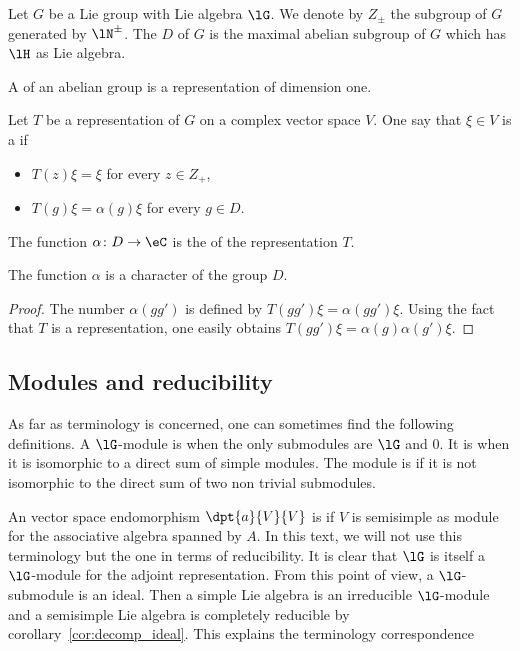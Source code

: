 Let $G$ be a Lie group with Lie algebra $\lG$. We denote by $Z_{\pm}$ the subgroup of $G$ generated by $\lN^{\pm}$. The  $D$ of $G$ is the maximal abelian subgroup of $G$ which has $\lH$ as Lie algebra.

A  of an abelian group is a representation of dimension one.

 Let $T$ be a representation of $G$ on a complex vector space $V$. One say that $\xi\in V$ is a  if
\begin{itemize}
\item $T(z)\xi=\xi$ for every $z\in Z_+$,
\item $T(g)\xi=\alpha(g)\xi$ for every $g\in D$.
\end{itemize}
The function $\alpha\colon D\to \eC$ is the  of the representation $T$.

\begin{lemma}
    The function $\alpha$ is a character of the group $D$.
\end{lemma}

\begin{proof}
    The number $\alpha(gg')$ is defined by $T(gg')\xi=\alpha(gg')\xi$. Using the fact that $T$ is a representation, one easily obtains $T(gg')\xi=\alpha(g)\alpha(g')\xi$.
\end{proof}

\subsection{Modules and reducibility}

As far as terminology is concerned, one can sometimes find the following definitions. A $\lG$-module is  when the only submodules are $\lG$ and $0$. It is  when it is isomorphic to a direct sum of simple modules. The module is  if it is not isomorphic to the direct sum of two non trivial submodules.

An vector space endomorphism $\dpt{a}{V}{V}$ is  if $V$ is semisimple as module for the associative algebra spanned by $A$. In this text, we will not use this terminology but the one in terms of reducibility. It is clear that $\lG$ is itself a $\lG$-module for the adjoint representation. From this point of view, a $\lG$-submodule is an ideal. Then a simple Lie algebra is an irreducible $\lG$-module and a semisimple Lie algebra is completely reducible by corollary~\ref{cor:decomp_ideal}. This explains the terminology correspondence

